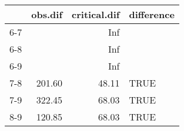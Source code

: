\begin{table}[ht]
\centering
\begin{tabular}{rrrl}
  \hline
 & obs.dif & critical.dif & difference \\ 
  \hline
6-7 &  & Inf &  \\ 
  6-8 &  & Inf &  \\ 
  6-9 &  & Inf &  \\ 
  7-8 & 201.60 & 48.11 & TRUE \\ 
  7-9 & 322.45 & 68.03 & TRUE \\ 
  8-9 & 120.85 & 68.03 & TRUE \\ 
   \hline
\end{tabular}
\end{table}
